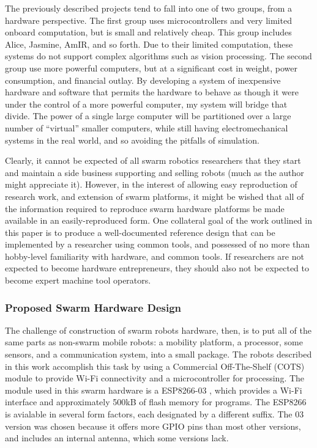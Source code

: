 \documentclass[]{article}
\begin{document}
The previously described projects tend to fall into one of two groups, from a hardware perspective. 
The first group uses microcontrollers and very limited onboard computation, but is small and relatively cheap.
This group includes Alice, Jasmine, AmIR, and so forth.
Due to their limited computation, these systems do not support complex algorithms such as vision processing. 
The second group use more powerful computers, but at a significant cost in weight, power consumption, and financial outlay.
By developing a system of inexpensive hardware and software that permits the hardware to behave as though it were under the control of a more powerful computer, my system will bridge that divide. 
The power of a single large computer will be partitioned over a large number of ``virtual'' smaller computers, while still having electromechanical systems in the real world, and so avoiding the pitfalls of simulation. 

Clearly, it cannot be expected of all swarm robotics researchers that they start and maintain a side business supporting and selling robots (much as the author might appreciate it).
However, in the interest of allowing easy reproduction of research work, and extension of swarm platforms, it might be wished that all of the information required to reproduce swarm hardware platforms be made available in an easily-reproduced form.
One collateral goal of the work outlined in this paper is to produce a well-documented reference design that can be implemented by a researcher using common tools, and possessed of no more than hobby-level familiarity with hardware, and common tools. 
If researchers are not expected to become hardware entrepreneurs, they should also not be expected to become expert machine tool operators.

\subsubsection{Proposed Swarm Hardware Design}

The challenge of construction of swarm robots hardware, then, is to put all of the same parts as non-swarm mobile robots: a mobility platform, a processor, some sensors, and a communication system, into a small package.  
The robots described in this work accomplish this task by using a Commercial Off-The-Shelf (COTS) module to provide Wi-Fi connectivity and a microcontroller for processing. 
The module used in this swarm hardware is a ESP8266-03  , which provides a Wi-Fi interface and approximately 500kB of flash memory for programs. 
The ESP8266 is avialable in several form factors, each designated by a different suffix. 
The 03 version was chosen because it offers more GPIO pins than most other versions, and includes an internal antenna, which some versions lack. 
\end{document}
